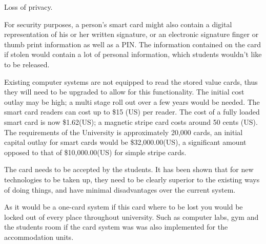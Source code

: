 \items Loss of privacy.

For security purposes, a person's smart card might also contain a digital
representation of his or her written signature, or an electronic signature
finger or thumb print information as well as a PIN. The information contained
on the card if stolen would contain a lot of personal information, which
students wouldn't like to be released. \cite{noonan}

Existing computer systems are not equipped to read the stored value cards, thus
they will need to be upgraded to allow for this functionality. The initial cost
outlay may be high; a multi stage roll out over a few years would be needed. The
smart card readers can cost up to \$15 (US) per reader. The cost of a fully
loaded smart card is now \$1.62(US); a magnetic stripe card costs around 50
cents (US). The requirements of the University is approximately 20,000 cards, an
initial capital outlay for smart cards would be \$32,000.00(US), a significant
amount opposed to that of \$10,000.00(US) for simple stripe cards. \cite{irwin}

The card needs to be accepted by the students. It has been shown that for new
technologies to be taken up, they need to be clearly superior to the existing
ways of doing things, and have minimal disadvantages over the current system.
\cite{noonan}

As it would be a one-card system if this card where to be lost you would be 
locked out of every place throughout university. Such as computer labs, gym and
the students room if the card system was was also implemented for the
accommodation units.
